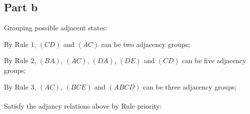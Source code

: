 \documentclass[12pt, a4paper]{article}
\begin{document}
	\begin{center}
	\end{center}
	
	\subsection*{Part b}
	Grouping possible adjacent states:
	
	By Rule 1, $(CD)$ and $(AC)$ can be two adjacency groups;
	
	By Rule 2, $(BA)$, $(AC)$, $(DA)$, $(DE)$ and $(CD)$ can be five adjacency groups;
	
	By Rule 3, $(AC)$, $(BCE)$ and $(ABCD)$ can be three adjacency groups;
	\\
	\\
	Satisfy the adjancy relations above by Rule priority:
	\begin{center}
	\end{center}
	
\end{document}
